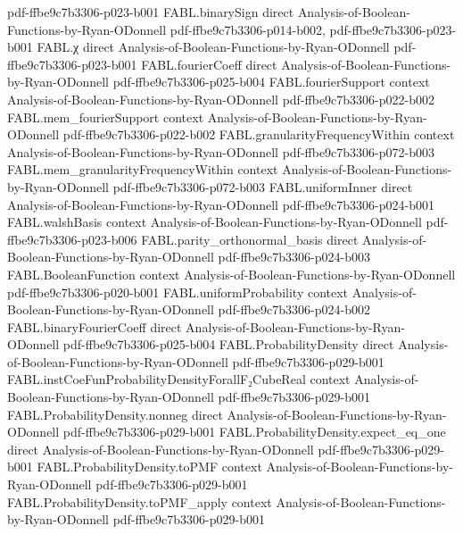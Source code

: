 \begin{theorem}
  {pdf-ffbe9c7b3306-p023-b001}
\proofstep
  {FABL.binarySign}
  {direct}
  {Analysis-of-Boolean-Functions-by-Ryan-ODonnell}
  {pdf-ffbe9c7b3306-p014-b002,
    pdf-ffbe9c7b3306-p023-b001}
\proofstep
  {FABL.χ}
  {direct}
  {Analysis-of-Boolean-Functions-by-Ryan-ODonnell}
  {pdf-ffbe9c7b3306-p023-b001}
\proofstep
  {FABL.fourierCoeff}
  {direct}
  {Analysis-of-Boolean-Functions-by-Ryan-ODonnell}
  {pdf-ffbe9c7b3306-p025-b004}
\proofstep
  {FABL.fourierSupport}
  {context}
  {Analysis-of-Boolean-Functions-by-Ryan-ODonnell}
  {pdf-ffbe9c7b3306-p022-b002}
\proofstep
  {FABL.mem_fourierSupport}
  {context}
  {Analysis-of-Boolean-Functions-by-Ryan-ODonnell}
  {pdf-ffbe9c7b3306-p022-b002}
\proofstep
  {FABL.granularityFrequencyWithin}
  {context}
  {Analysis-of-Boolean-Functions-by-Ryan-ODonnell}
  {pdf-ffbe9c7b3306-p072-b003}
\proofstep
  {FABL.mem_granularityFrequencyWithin}
  {context}
  {Analysis-of-Boolean-Functions-by-Ryan-ODonnell}
  {pdf-ffbe9c7b3306-p072-b003}
\proofstep
  {FABL.uniformInner}
  {direct}
  {Analysis-of-Boolean-Functions-by-Ryan-ODonnell}
  {pdf-ffbe9c7b3306-p024-b001}
\proofstep
  {FABL.walshBasis}
  {context}
  {Analysis-of-Boolean-Functions-by-Ryan-ODonnell}
  {pdf-ffbe9c7b3306-p023-b006}
\proofstep
  {FABL.parity_orthonormal_basis}
  {direct}
  {Analysis-of-Boolean-Functions-by-Ryan-ODonnell}
  {pdf-ffbe9c7b3306-p024-b003}
\proofstep
  {FABL.BooleanFunction}
  {context}
  {Analysis-of-Boolean-Functions-by-Ryan-ODonnell}
  {pdf-ffbe9c7b3306-p020-b001}
\proofstep
  {FABL.uniformProbability}
  {context}
  {Analysis-of-Boolean-Functions-by-Ryan-ODonnell}
  {pdf-ffbe9c7b3306-p024-b002}
\proofstep
  {FABL.binaryFourierCoeff}
  {direct}
  {Analysis-of-Boolean-Functions-by-Ryan-ODonnell}
  {pdf-ffbe9c7b3306-p025-b004}
\proofstep
  {FABL.ProbabilityDensity}
  {direct}
  {Analysis-of-Boolean-Functions-by-Ryan-ODonnell}
  {pdf-ffbe9c7b3306-p029-b001}
\proofstep
  {FABL.instCoeFunProbabilityDensityForallF₂CubeReal}
  {context}
  {Analysis-of-Boolean-Functions-by-Ryan-ODonnell}
  {pdf-ffbe9c7b3306-p029-b001}
\proofstep
  {FABL.ProbabilityDensity.nonneg}
  {direct}
  {Analysis-of-Boolean-Functions-by-Ryan-ODonnell}
  {pdf-ffbe9c7b3306-p029-b001}
\proofstep
  {FABL.ProbabilityDensity.expect_eq_one}
  {direct}
  {Analysis-of-Boolean-Functions-by-Ryan-ODonnell}
  {pdf-ffbe9c7b3306-p029-b001}
\proofstep
  {FABL.ProbabilityDensity.toPMF}
  {context}
  {Analysis-of-Boolean-Functions-by-Ryan-ODonnell}
  {pdf-ffbe9c7b3306-p029-b001}
\proofstep
  {FABL.ProbabilityDensity.toPMF_apply}
  {context}
  {Analysis-of-Boolean-Functions-by-Ryan-ODonnell}
  {pdf-ffbe9c7b3306-p029-b001}

\end{theorem}
